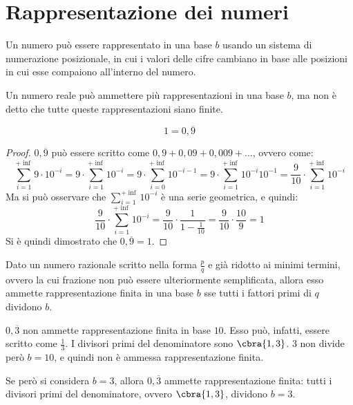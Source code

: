 \appendix
\chapter{Rappresentazione dei numeri}
Un numero può essere rappresentato in una base $b$ usando un sistema
di numerazione posizionale, in cui i valori delle cifre cambiano in base
alle posizioni in cui esse compaiono all'interno del numero.

\begin{rem}
    Un numero reale può ammettere più rappresentazioni in una base $b$, ma
    non è detto che tutte queste rappresentazioni siano finite.
\end{rem}

\begin{example}
    \[
        1 = 0,\overline{9}
    \]
    \begin{proof}
        $0,\overline{9}$ può essere scritto come $0,9 + 0,09 + 0,009 + \ldots$,
        ovvero come:
        \[
            \sum_{i=1}^{+\inf} 9 \cdot 10^{-i} =
            9 \cdot \sum_{i=1}^{+\inf} 10^{-i} =
            9 \cdot \sum_{i=0}^{+\inf} 10^{-i-1} =
            9 \cdot \sum_{i=1}^{+\inf} 10^{-i} 10^{-1} =
            \frac{9}{10} \cdot \sum_{i=1}^{+\inf} 10^{-i}
        \]
        Ma si può osservare che $\sum_{i=1}^{+\inf} 10^{-i}$ è una serie
        geometrica, e quindi:
        \[
            \frac{9}{10} \cdot \sum_{i=1}^{+\inf} 10^{-i} =
            \frac{9}{10} \cdot \frac{1}{1-\frac{1}{10}} =
            \frac{9}{10} \cdot \frac{10}{9} = 1
        \]
        Si è quindi dimostrato che $0,\overline{9} = 1$.
    \end{proof}
\end{example}

\begin{thm}
    Dato un numero razionale scritto nella forma $\frac{p}{q}$ e già
    ridotto ai minimi termini, ovvero la cui frazione non può essere
    ulteriormente semplificata, allora esso ammette rappresentazione
    finita in una base $b$ sse tutti i fattori primi di $q$ dividono $b$.
\end{thm}
\begin{example}
    $0,\overline{3}$ non ammette rappresentazione finita in base $10$.
    Esso può, infatti, essere scritto come $\frac{1}{3}$. I divisori primi
    del denominatore sono $\cbra{1, 3}$. $3$ non divide però $b=10$,
    e quindi non è ammessa rappresentazione finita.

    Se però si considera $b=3$, allora $0,\overline{3}$ ammette rappresentazione
    finita: tutti i divisori primi del denominatore, ovvero $\cbra{1, 3}$,
    dividono $b=3$.
\end{example}


